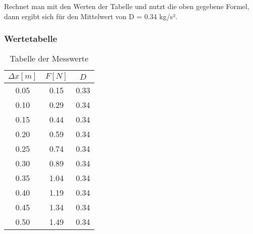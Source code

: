\documentclass[captions=tableheading]{scrartcl}
\begin{document}
Rechnet man mit den Werten der Tabelle und nutzt die oben gegebene Formel, dann ergibt sich für den Mittelwert von D =
0.34 kg/s².


\subsubsection{Wertetabelle}

\begin{table}
    \centering
    \caption{Tabelle der Messwerte}
    \label{tab:some_data}
    \begin{tabular}{c c c}
        \toprule
        $\Delta x [m]$ & $F [N]$ & $D$\\
        \midrule
        0.05 & 0.15 & 0.33 \\
        0.10 & 0.29 & 0.34 \\
        0.15 & 0.44 & 0.34 \\
        0.20 & 0.59 & 0.34 \\
        0.25 & 0.74 & 0.34 \\
        0.30 & 0.89 & 0.34 \\
        0.35 & 1.04 & 0.34 \\
        0.40 & 1.19 & 0.34 \\
        0.45 & 1.34 & 0.34 \\
        0.50 & 1.49 & 0.34 \\
        \bottomrule
    \end{tabular}
\end{table}

\end{document}
